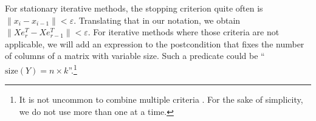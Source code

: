 For stationary iterative methods, the stopping criterion quite often is $\| x_i - x_{i-1} \| < \varepsilon$. Translating that in our notation, we obtain $\| X e_r^T - X e_{r-1}^T \| < \varepsilon$. 
%
%
For iterative methods where those criteria are not applicable, we will add an expression to the postcondition that fixes the number of columns of a matrix with variable size. Such a predicate could be ``$\text{size}(Y) = n \times k$''.\footnote{It is not uncommon to combine multiple criteria \cite{barrett:templates}. For the sake of simplicity, we do not use more than one at a time.}


